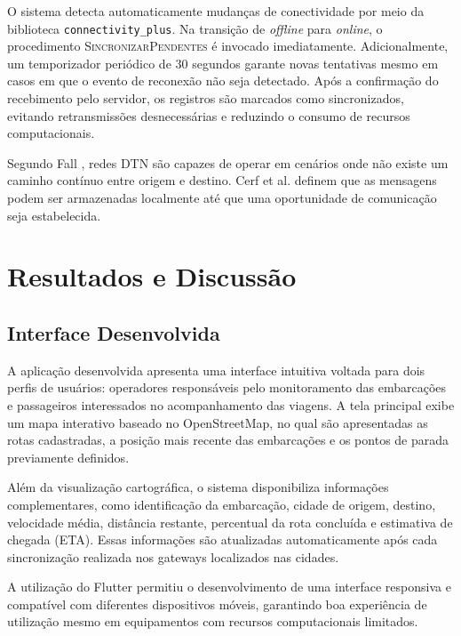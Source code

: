 \documentclass[12pt]{article}
\begin{document}
O sistema detecta automaticamente mudanças de conectividade por meio da biblioteca \texttt{connectivity\_plus}. Na transição de \textit{offline} para \textit{online}, o procedimento \textsc{SincronizarPendentes} é invocado imediatamente. Adicionalmente, um temporizador periódico de 30 segundos garante novas tentativas mesmo em casos em que o evento de reconexão não seja detectado. Após a confirmação do recebimento pelo servidor, os registros são marcados como sincronizados, evitando retransmissões desnecessárias e reduzindo o consumo de recursos computacionais.

Segundo Fall \cite{fall2003dtn}, redes DTN são capazes de operar em cenários onde não existe um caminho contínuo entre origem e destino. Cerf et al. \cite{cerf2007rfc4838} definem que as mensagens podem ser armazenadas localmente até que uma oportunidade de comunicação seja estabelecida.

\section{Resultados e Discussão}
\subsection{Interface Desenvolvida}
A aplicação desenvolvida apresenta uma interface intuitiva voltada para dois perfis de usuários: operadores responsáveis pelo monitoramento das embarcações e passageiros interessados no acompanhamento das viagens. A tela principal exibe um mapa interativo baseado no OpenStreetMap, no qual são apresentadas as rotas cadastradas, a posição mais recente das embarcações e os pontos de parada previamente definidos.

Além da visualização cartográfica, o sistema disponibiliza informações complementares, como identificação da embarcação, cidade de origem, destino, velocidade média, distância restante, percentual da rota concluída e estimativa de chegada (ETA). Essas informações são atualizadas automaticamente após cada sincronização realizada nos gateways localizados nas cidades.

A utilização do Flutter permitiu o desenvolvimento de uma interface responsiva e compatível com diferentes dispositivos móveis, garantindo boa experiência de utilização mesmo em equipamentos com recursos computacionais limitados.
\end{document}
